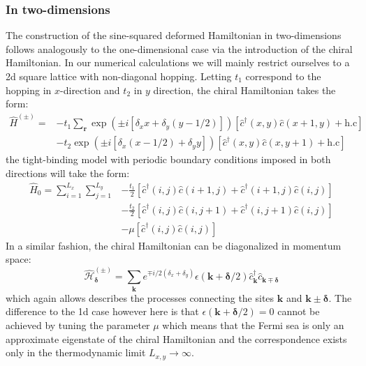 \documentclass[11pt, a4paper]{article}
\theoremstyle{definition} %
\begin{document}
\subsubsection{In two-dimensions}
The construction of the sine-squared deformed Hamiltonian in two-dimensions follows analogously to the one-dimensional case via the introduction of the chiral Hamiltonian. In our numerical calculations we will mainly restrict ourselves to a 2d square lattice with non-diagonal hopping. Letting $t_1$ correspond to the hopping in $x$-direction and $t_2$ in $y$ direction, the chiral Hamiltonian takes the form:
\begin{equation}
\begin{split}
	\hat{H}^{(\pm)} = &-t_1 \sum_{\mathbf{r}} \exp(\pm i[\delta_x x + \delta_y( y - 1/2)]) \left[\hat{c}^\dagger(x,y) \hat{c}(x+1, y) + \text{h.c}\right] \\
		&- t_2 \exp(\pm i [\delta_x(x-1/2) + \delta_y y]) \left[\hat{c}^\dagger(x,y) \hat{c}(x, y+1) + \text{h.c} \right]
\end{split}
\end{equation}
the tight-binding model with periodic boundary conditions imposed in both directions will take the form:
\begin{equation}
\begin{split}
\hat{H}_0 =  \sum_{i = 1}^{L_x} \sum_{j=1}^{L_y}& -\frac{t_1}{2} \left[ \hat{c}^\dagger(i, j) \hat{c}(i+1, j) + \hat{c}^\dagger(i+1, j)\hat{c}(i, j) \right] \\
	&-\frac{t_2}{2} \left[\hat{c}^\dagger(i,j) \hat{c}(i,j+1) + \hat{c}^\dagger(i, j+1)\hat{c}(i,j) \right] \\
	& - \mu \left[ \hat{c}^\dagger(i,j) \hat{c}(i,j)\right]
\end{split}
\end{equation}
In a similar fashion, the chiral Hamiltonian can be diagonalized in momentum space:
\begin{equation}
	\hat{\mathcal{H}}_{\mathbf{\delta}}^{(\pm)} = \sum_{\mathbf{k}} e^{\mp i/2(\delta_x + \delta_y)} \epsilon(\mathbf{k} + \mathbf{\delta}/2)\hat{c}_{\mathbf{k}}^\dagger \hat{c}_{\mathbf{k} \mp \mathbf{\delta}}
\end{equation}
which again allows describes the processes connecting the sites $\mathbf{k}$ and $\mathbf{k} \pm \mathbf{\delta}$. The difference to the 1d case however here is that $\epsilon(\mathbf{k} + \mathbf{\delta}/2) = 0$ cannot be achieved by tuning the parameter $\mu$ which means that the Fermi sea is only an approximate eigenstate of the chiral Hamiltonian and the correspondence exists only in the thermodynamic limit $L_{x,y} \rightarrow \infty$.
\end{document}
